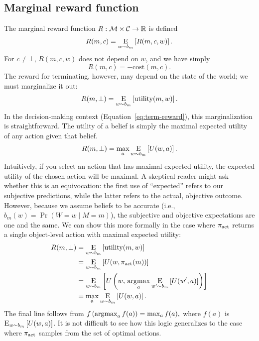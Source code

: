 \subsection{Marginal reward function}
The marginal reward function $R: \M \times \C \rightarrow \R$ is defined
%
\begin{equation}
R(m, c) = \expectunder{R(m, c, w)}{w \sim b_m}.
\end{equation}
%
For $c \neq \bot$, $R(m, c, w)$ does not depend on $w$, and we have simply
%
\begin{equation}
  R(m, c) = -\text{cost}(m, c).
\end{equation}
The reward for terminating, however, may depend on the state of the world; we must marginalize it out:
%
\begin{equation}\label{eq:marginal-term}
  R(m, \bot) = \expectunder{\utility(m, w)}{w \sim b_m}.
\end{equation}
%
In the decision-making context (Equation~\ref{eq:term-reward}), this marginalization is straightforward. The utility of a belief is simply the maximal expected utility of any action given that belief. 
%
\begin{equation}
  R(m, \bot) = \max_a \expectunder{U(w, a)}{w \sim b_m}.
\end{equation}
%
Intuitively, if you select an action that has maximal expected utility, the expected utility of the chosen action will be maximal. A skeptical reader might ask whether this is an equivocation: the first use of ``expected'' refers to our subjective predictions, while the latter refers to the actual, objective outcome. However, because we assume beliefs to be accurate (i.e., $b_m(w) = \Pr(W = w \mid M = m)$), the subjective and objective expectations are one and the same. We can show this more formally in the case where $\pi\act$ returns a single object-level action with maximal expected utility:
\begin{equation}
\begin{aligned}
R(m, \bot)
&= \expectunder{\utility(m, w)}{w \sim b_m} \\
&= \expectunder{U(w, \pi\act(m))}{w \sim b_m} \\
&= \expectunder{U\left(w,\, \argmax_a \expectunder{U(w', a)}{w' \sim b_m}\right)}{w \sim b_m} \\
&= \max_a \expectunder{U(w, a)}{w \sim b_m}
.
\end{aligned}
\end{equation}
%
The final line follows from
%
\begin{math}
  f\left(\argmax_a f(a)\right) = \max_a f(a)
  ,
\end{math}
%
where $f(a)$ is $\expectunder{U(w, a)}{w \sim b_m}$. It is not difficult to see how this logic generalizes to the case where $\pi\act$ samples from the set of optimal actions.

